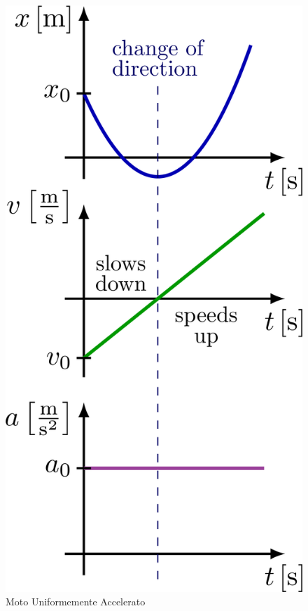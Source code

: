 \begin{figure}[H]
\centering
\begin{minipage}[c]{0.40\textwidth}
\centering
{}
\caption{Moto Uniformemente Accelerato}
\label{img:motorettuniformementeacc} 
\end{minipage}%
\hspace{20mm}%
\begin{minipage}[c]{0.40\textwidth}
\centering
\includegraphics[width=1\textwidth]{image/motoUniformementeAcc.png}

\end{minipage}
\end{figure}
